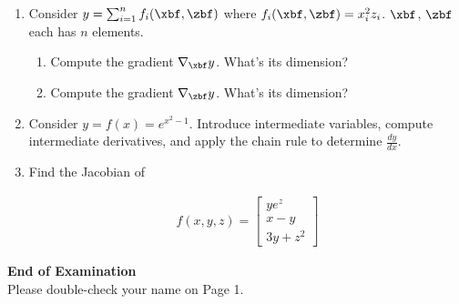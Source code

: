 \documentclass[11pt,letterpaper]{article}
\begin{document}
\begin{enumerate}
\item Consider $y = \sum_{i=1}^n f_i(\xbf, \zbf)$ where $f_i(\xbf, \zbf) = x_i^2 z_i$. $\xbf$, $\zbf$ each has $n$ elements.

\begin{enumerate}

\item Compute the gradient $\nabla_\xbf y$. What's its dimension?

\item Compute the gradient $\nabla_\zbf y$. What's its dimension? 
\end{enumerate}

\item Consider $ y = f(x) = e^{x^2 - 1}$. Introduce intermediate variables,  compute intermediate derivatives, and apply the chain rule to determine $\frac{dy}{dx}$.
\item Find the Jacobian of 

\begin{align*}
f(x, y, z) = \begin{bmatrix}
ye^z \\ x -y \\ 3y + z^2
\end{bmatrix}
\end{align*}


\end{enumerate}


\newpage

\vspace{12pt}

\begin{tcolorbox}[
  enhanced,
  colback=NavyDeep, colframe=NavyDeep,
  arc=5pt, boxrule=0pt,
  left=12pt, right=12pt, top=8pt, bottom=8pt,
]
  \begin{center}
    {\color{GoldBright}\bfseries\faGraduationCap\enspace End of Examination}\\[3pt]
    {\color{MidGray}\small
     Please double-check your name on Page 1.}
  \end{center}
\end{tcolorbox}
\end{document}
